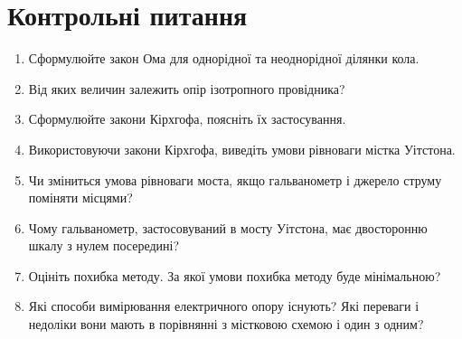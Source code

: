 \documentclass{LabWork}
\begin{document}
\section{Контрольні питання}

\begin{enumerate}
	\item Сформулюйте закон Ома для однорідної та неоднорідної ділянки кола.
	\item Від яких величин залежить опір ізотропного провідника?
	\item Сформулюйте закони Кірхгофа, поясніть їх застосування.
	\item Використовуючи закони Кірхгофа, виведіть умови рівноваги містка Уітстона.
	\item Чи зміниться умова рівноваги моста, якщо гальванометр і джерело струму поміняти місцями?
	\item Чому гальванометр, застосовуваний в мосту Уітстона, має двосторонню шкалу з нулем посередині?
	\item Оцініть похибка методу. За якої умови похибка методу буде мінімальною?
    \item Які способи вимірювання електричного опору існують? Які переваги і недоліки вони мають в порівнянні з містковою схемою і один з одним?
\end{enumerate}
\end{document}
